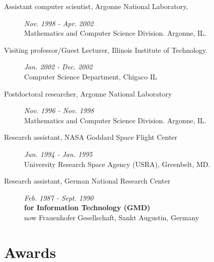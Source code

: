 \documentclass{article}
\begin{document}
\begin{description}
\item[ 	Assistant computer scientist, Argonne National Laboratory, ] \hfill {\it Nov. 1998 - Apr. 2002} ~\\
  Mathematics and Computer Science Division.  Argonne, IL.
    
\item[ 	Visiting professor/Guest Lecturer, Illinois Institute of Technology. ] \hfill {\it Jan. 2002 - Dec. 2002} ~\\
  Computer Science Department, Chigaco IL
  
\item[ 	Postdoctoral researcher,   Argonne National Laboratory ] \hfill {\it Nov. 1996 - Nov. 1998} ~\\
  Mathematics and Computer Science Division.  Argonne, IL.
  
\item[ 	Research assistant, NASA Goddard Space Flight Center] \hfill {\it Jun. 1994 - Jan. 1995} ~\\
  University Research Space Agency (USRA), Greenbelt, MD.

\item[ 	Research assistant, German National Research Center] \hfill {\it Feb. 1987 - Sept. 1990} ~\\
  {\bf  for Information Technology (GMD) } \\
  now Frauenhofer Gesellschaft, Sankt Augustin, Germany
  
\end{description}

\section{Awards}   
\end{document}
